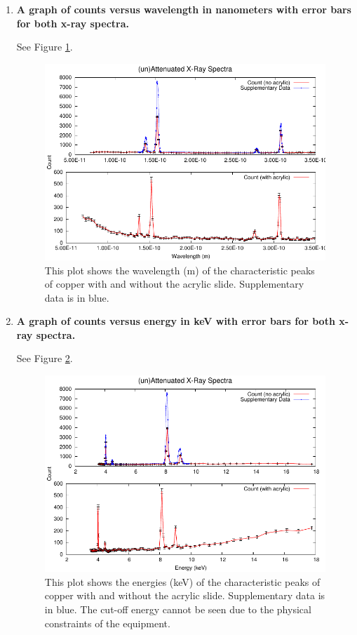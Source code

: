 \begin{enumerate}
\item {\bf A graph of counts versus wavelength in nanometers with error bars for both x-ray spectra.}\newline

See Figure \ref{fig:xrcg2}.

\begin{figure}
\includegraphics{XRaySpec-Wavelength.pdf}
\caption{This plot shows the wavelength (m) of the characteristic peaks of copper with and without the acrylic slide. Supplementary data is in blue.}
\label{fig:xrcg2}
\end{figure}

\item {\bf A graph of counts versus energy in keV with error bars for both x-ray spectra.}\newline

See Figure \ref{fig:xrcg3}.

\begin{figure}
\includegraphics{XRaySpec-Energy.pdf}
\caption{This plot shows the energies (keV) of the characteristic peaks of copper with and without the acrylic slide. Supplementary data is in blue. The cut-off energy cannot be seen due to the physical constraints of the equipment. }
\label{fig:xrcg3}
\end{figure}


\end{enumerate}
